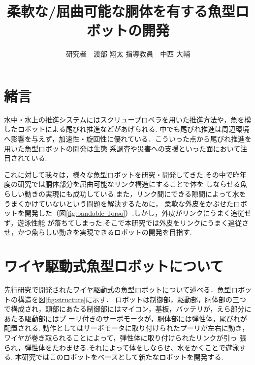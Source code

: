 \documentclass{jarticle}
\begin{document}

\title{
柔軟な/屈曲可能な胴体を有する魚型ロボットの開発
}
\author{
研究者　渡部 翔太\;\;\;
指導教員　中西 大輔
}

\maketitle

\thispagestyle{empty}  %

\section{緒言}

水中・水上の推進システムにはスクリュープロペラを用いた推進方法や，魚を模したロボットによる尾びれ推進などがあげられる.
中でも尾びれ推進は周辺環境へ影響を与えず，加速性・旋回性に優れている．こういった点から尾びれ推進を用いた魚型ロボットの開発は生態
系調査や災害への支援といった面において注目されている\cite{ichi}.

これに対して我々は，様々な魚型ロボットを研究・開発してきた.その中で昨年度の研究では胴体部分を屈曲可能なリンク構造にすることで体を
しならせる魚らしい動きの実現にも成功している.また，リンク間にできる隙間によって水をうまくかけていないという問題を解決するために，
柔軟な外皮をかぶせたロボットを開発した\cite{ni}（図\ref{fig:bandable-Torso}）.しかし，外皮がリンクにうまく追従せず，遊泳性能
が落ちてしまった.そこで本研究では外皮をリンクにうまく追従させ，かつ魚らしい動きを実現できるロボットの開発を目指す.

\vspace*{-1mm}
\section{ワイヤ駆動式魚型ロボットについて}
先行研究で開発されたワイヤ駆動式の魚型ロボットについて述べる．魚型ロボットの構造を図\ref{fig:structure}に示す．
ロボットは制御部，駆動部，胴体部の三つで構成され，頭部にあたる制御部にはマイコン，基板，バッテリが，えら部分にあたる駆動部にはプ
ーリ付きのサーボモータが，胴体部には弾性体，尾びれが配置される.
動作としてはサーボモータに取り付けられたプーリが左右に動き，ワイヤが巻き取られることによって，弾性体に取り付けられたリンクが引っ
張られ，弾性体をたわませる.それによって体をしならせ、水をかくことで遊泳する.
本研究ではこのロボットをベースとして新たなロボットを開発する.
\end{document}
